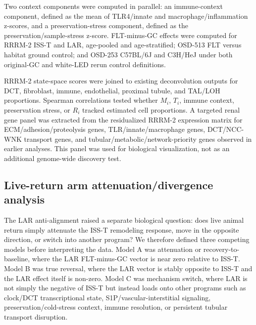 \documentclass[11pt]{article}
\begin{document}
Two context components were computed in parallel: an immune-context component, defined as the mean of TLR4/innate and macrophage/inflammation z-scores, and a preservation-stress component, defined as the preservation/sample-stress z-score. FLT-minus-GC effects were computed for RRRM-2 ISS-T and LAR, age-pooled and age-stratified; OSD-513 FLT versus habitat ground control; and OSD-253 C57BL/6J and C3H/HeJ under both original-GC and white-LED rerun control definitions.

RRRM-2 state-space scores were joined to existing deconvolution outputs for DCT, fibroblast, immune, endothelial, proximal tubule, and TAL/LOH proportions. Spearman correlations tested whether $M_i$, $T_i$, immune context, preservation stress, or $R_i$ tracked estimated cell proportions. A targeted renal gene panel was extracted from the residualized RRRM-2 expression matrix for ECM/adhesion/proteolysis genes, TLR/innate/macrophage genes, DCT/NCC-WNK transport genes, and tubular/metabolic/network-priority genes observed in earlier analyses. This panel was used for biological visualization, not as an additional genome-wide discovery test.

\subsection{Live-return arm attenuation/divergence analysis}

The LAR anti-alignment raised a separate biological question: does live animal return simply attenuate the ISS-T remodeling response, move in the opposite direction, or switch into another program? We therefore defined three competing models before interpreting the data. Model A was attenuation or recovery-to-baseline, where the LAR FLT-minus-GC vector is near zero relative to ISS-T. Model B was true reversal, where the LAR vector is stably opposite to ISS-T and the LAR effect itself is non-zero. Model C was mechanism switch, where LAR is not simply the negative of ISS-T but instead loads onto other programs such as clock/DCT transcriptional state, S1P/vascular-interstitial signaling, preservation/cold-stress context, immune resolution, or persistent tubular transport disruption.
\end{document}
